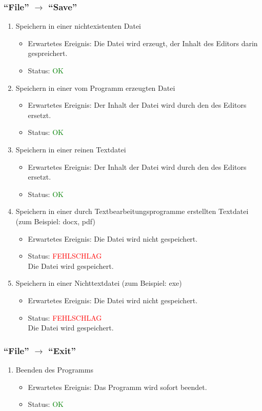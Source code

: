 \subsubsection{"`File"' $\rightarrow$ "`Save"'}
\begin{enumerate}
\item Speichern in einer nichtexistenten Datei
\begin{itemize}
\item Erwartetes Ereignis: Die Datei wird erzeugt, der Inhalt des Editors darin gespreichert. 
\item Status: \textcolor{green}{OK} 
\end{itemize}
\item Speichern in einer vom Programm erzeugten Datei
\begin{itemize}
\item Erwartetes Ereignis: Der Inhalt der Datei wird durch den des Editors ersetzt. 
\item Status: \textcolor{green}{OK} 
\end{itemize}
\item Speichern in einer reinen Textdatei
\begin{itemize}
\item Erwartetes Ereignis: Der Inhalt der Datei wird durch den des Editors ersetzt. 
\item Status: \textcolor{green}{OK} 
\end{itemize}
\item Speichern in einer durch Textbearbeitungsprogramme erstellten Textdatei (zum Beispiel: docx, pdf)
\begin{itemize}
\item Erwartetes Ereignis: Die Datei wird nicht gespeichert. 
\item Status: \textcolor{red}{FEHLSCHLAG} \\
Die Datei wird gespeichert.
\end{itemize}
\item Speichern in einer Nichttextdatei (zum Beispiel: exe)
\begin{itemize}
\item Erwartetes Ereignis: Die Datei wird nicht gespeichert. 
\item Status: \textcolor{red}{FEHLSCHLAG} \\
Die Datei wird gespeichert.
\end{itemize}
\end{enumerate}
\subsubsection{"`File"' $\rightarrow$ "`Exit"'}
\begin{enumerate}
\item Beenden des Programms
\begin{itemize}
\item Erwartetes Ereignis: Das Programm wird sofort beendet. 
\item Status: \textcolor{green}{OK}
\end{itemize}
\end{enumerate}
